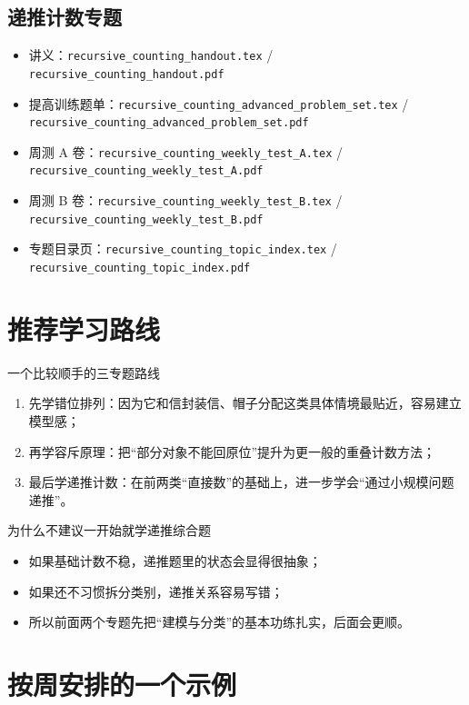 \documentclass[11pt,a4paper,fontset=fandol]{ctexart}
\begin{document}
\subsection{递推计数专题}
\begin{itemize}
  \item 讲义：\texttt{recursive\_counting\_handout.tex} / \texttt{recursive\_counting\_handout.pdf}
  \item 提高训练题单：\texttt{recursive\_counting\_advanced\_problem\_set.tex} / \texttt{recursive\_counting\_advanced\_problem\_set.pdf}
  \item 周测 A 卷：\texttt{recursive\_counting\_weekly\_test\_A.tex} / \texttt{recursive\_counting\_weekly\_test\_A.pdf}
  \item 周测 B 卷：\texttt{recursive\_counting\_weekly\_test\_B.tex} / \texttt{recursive\_counting\_weekly\_test\_B.pdf}
  \item 专题目录页：\texttt{recursive\_counting\_topic\_index.tex} / \texttt{recursive\_counting\_topic\_index.pdf}
\end{itemize}

\section{推荐学习路线}

\begin{goalbox}{一个比较顺手的三专题路线}
\begin{enumerate}
  \item 先学错位排列：因为它和信封装信、帽子分配这类具体情境最贴近，容易建立模型感；
  \item 再学容斥原理：把“部分对象不能回原位”提升为更一般的重叠计数方法；
  \item 最后学递推计数：在前两类“直接数”的基础上，进一步学会“通过小规模问题递推”。
\end{enumerate}
\end{goalbox}

\begin{warnbox}{为什么不建议一开始就学递推综合题}
\begin{itemize}
  \item 如果基础计数不稳，递推题里的状态会显得很抽象；
  \item 如果还不习惯拆分类别，递推关系容易写错；
  \item 所以前面两个专题先把“建模与分类”的基本功练扎实，后面会更顺。
\end{itemize}
\end{warnbox}

\section{按周安排的一个示例}
\end{document}
